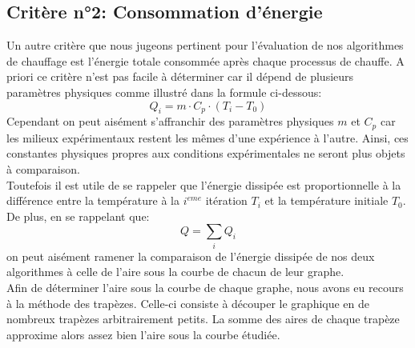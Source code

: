 \documentclass[12pt]{report}
\begin{document}
\subsection{Critère n°2: Consommation d'énergie}
Un autre critère que nous jugeons pertinent pour l'évaluation de nos algorithmes de chauffage est l'énergie totale consommée après chaque processus de chauffe. A priori ce critère n'est pas facile à déterminer car il dépend de plusieurs paramètres physiques comme illustré dans la formule ci-dessous:
\begin{equation}
Q_i = m\cdot C_p \cdot (T_i-T_0)
\end{equation}
Cependant on peut aisément s'affranchir des paramètres physiques $m$ et $C_p$ car les milieux expérimentaux restent les mêmes d'une expérience à l'autre. Ainsi, ces constantes physiques propres aux conditions expérimentales ne seront plus objets à comparaison.\\
Toutefois il est utile de se rappeler que l'énergie dissipée est proportionnelle à la différence entre la température à la $i^{eme}$ itération $T_i$ et la température initiale $T_0$. De plus, en se rappelant que:
\begin{equation}
Q = \sum_{i}Q_i
\end{equation}
on peut aisément ramener la comparaison de l'énergie dissipée de nos deux algorithmes à celle de l'aire sous la courbe de chacun de leur graphe.\\
Afin de déterminer l'aire sous la courbe de chaque graphe, nous avons eu recours à la méthode des trapèzes. Celle-ci consiste à découper le graphique en de nombreux trapèzes arbitrairement petits. La somme des aires de chaque trapèze approxime alors assez bien l'aire sous la courbe étudiée.\\
\end{document}
